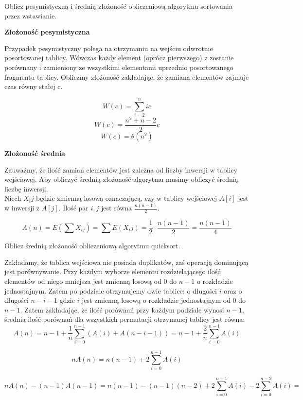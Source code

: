\documentclass[main.tex]{subfiles}
\begin{document}
    \begin{exercise}
        Oblicz pesymistyczną i średnią złożoność obliczeniową algorytmu sortowania przez wstawianie.
    \end{exercise}

    \textbf{Złożoność pesymistyczna}

    Przypadek pesymistyczny polega na otrzymaniu na wejściu odwrotnie posortowanej tablicy.
    Wówczas każdy element (oprócz pierwszego) z zostanie porównany
    i zamieniony ze wszystkimi elementami uprzednio posortowanego fragmentu tablicy.
    Obliczmy złożoność zakładając, że zamiana elementów zajmuje czas równy stałej $c$.

    $$W(c) = \sum_{i = 2}^nic$$
    $$W(c) = \frac{n^2 + n - 2}{2}c$$
    $$W(c) = \theta(n^2)$$

    \textbf{Złożoność średnia}

    Zauważmy, że ilość zamian elementów jest zależna od liczby inwersji w tablicy wejściowej. Aby obliczyć średnią złożoność algorytmu musimy obliczyć średnią liczbę inwersji.\\

    Niech $X_ij$ będzie zmienną losową oznaczającą, czy w tablicy wejściowej $A[i]$ jest w inwersji z $A[j]$.
    Ilość par $i,j$ jest równa $\frac{n(n-1)}{2}.$

    $$A(n) = E(\sum X_{ij}) = \sum E(X_ij) = \frac{1}{2} \cdot \frac{n(n - 1)}{2} = \frac{n(n - 1)}{4}$$

    \begin{exercise}
        Oblicz średnią złożoność obliczeniową algorytmu quicksort.
    \end{exercise}

    Zakładamy, że tablica wejściowa nie posiada duplikatów, zaś operacją dominującą jest porównywanie.
    Przy każdym wyborze elementu rozdzielającego ilość elementów od niego mniejsza jest zmienną losową od 0 do $n - 1$ o rozkładzie jednostajnym.
    Zatem po podziale otrzymujemy dwie tablice: o długości $i$ oraz o długości $n - i - 1$ gdzie $i$ jest zmienną losową o rozkładzie jednostajnym od 0 do $n - 1$.
    Zatem zakładając, że ilość porównań przy każdym podziale wynosi $n - 1$, średnia ilość porównań dla wszystkich permutacji otrzymanej tablicy jest równa:
    $$A(n) = n - 1 + \frac{1}{n}\sum_{i = 0}^{n - 1}(A(i) + A(n - i - 1)) =
    n - 1 + \frac{2}{n}\sum_{i = 0}^{n - 1}A(i)$$

    $$nA(n) = n(n - 1) + 2 \sum_{i = 0}^{n - 1}A(i)$$

    $$nA(n) - (n - 1)A(n-1) = n(n - 1) - (n - 1)(n - 2) + 2\sum_{i = 0}^{n - 1}A(i) - 2\sum_{i = 0}^{n - 2}A(i) = $$
\end{document}
